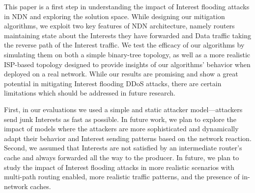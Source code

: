 \documentclass[10pt,conference]{IEEEtran}
\begin{document}
{%

This paper is a first step in understanding the impact of Interest flooding attacks in NDN and exploring the solution space. 
While designing our mitigation algorithms, we exploit two key features of NDN architecture, namely routers maintaining state about the Interests they have forwarded and Data traffic taking the reverse path of the Interest traffic. 
We test the efficacy of our algorithms by simulating them on both a simple binary-tree topology, %
as well as a more realistic ISP-based topology designed to provide insights of our algorithms' behavior when deployed on a real network. 
While our results are promising and show a great potential in mitigating Interest flooding DDoS attacks, there are certain limitations which should be addressed in future research. 

First, in our evaluations we used a simple and static attacker model---attackers send junk Interests as fast as possible. 
In future work, we plan to explore the impact of models where the attackers are more sophisticated and dynamically adapt their behavior and Interest sending patterns based on the network reaction. 
Second, we assumed that Interests are not satisfied by an intermediate router's cache and always forwarded all the way to the producer.  
In future, we plan to study the impact of Interest flooding attacks in more realistic scenarios with multi-path routing enabled, more realistic traffic patterns, and the presence of in-network caches.



}
\end{document}
